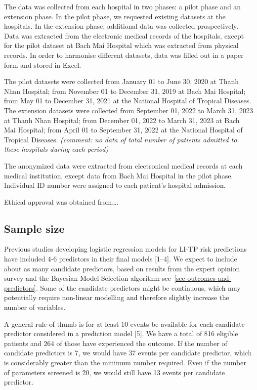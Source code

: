 \documentclass[
  letterpaper,
  DIV=11,
  numbers=noendperiod]{scrartcl}
\begin{document}
The data was collected from each hospital in two phases: a pilot phase
and an extension phase. In the pilot phase, we requested existing
datasets at the hospitals. In the extension phase, additional data was
collected prospectively. Data was extracted from the electronic medical
records of the hospitals, except for the pilot dataset at Bach Mai
Hospital which was extracted from physical records. In order to
harmonise different datasets, data was filled out in a paper form and
stored in Excel.

The pilot datasets were collected from January 01 to June 30, 2020 at
Thanh Nhan Hospital; from November 01 to December 31, 2019 at Bach Mai
Hospital; from May 01 to December 31, 2021 at the National Hospital of
Tropical Diseases. The extension datasets were collected from September
01, 2022 to March 31, 2023 at Thanh Nhan Hospital; from December 01,
2022 to March 31, 2023 at Bach Mai Hospital; from April 01 to September
31, 2022 at the National Hospital of Tropical Diseases. \emph{(comment:
no data of total number of patients admitted to these hospitals during
each period)}

The anonymized data were extracted from electronical medical records at
each medical institution, except data from Bach Mai Hospital in the
pilot phase. Individual ID number were assigned to each patient's
hospital admission.

Ethical approval was obtained from\ldots.

\subsection{Sample size}\label{sample-size}

Previous studies developing logistic regression models for LI-TP risk
predictions have included 4-6 predictors in their final models
{[}1--4{]}. We expect to include about as many candidate predictors,
based on results from the expert opinion survey and the Bayesian Model
Selection algorithm see~\ref{sec-outcomes-and-predictors}. Some of the
candidate predictors might be continuous, which may potentially require
non-linear modelling and therefore slightly increase the number of
variables.

A general rule of thumb is for at least 10 events be available for each
candidate predictor considered in a prediction model {[}5{]}. We have a
total of 816 eligible patients and 264 of those have experienced the
outcome. If the number of candidate predictors is 7, we would have 37
events per candidate predictor, which is considerably greater than the
minimum number required. Even if the number of parameters screened is
20, we would still have 13 events per candidate predictor.
\end{document}
